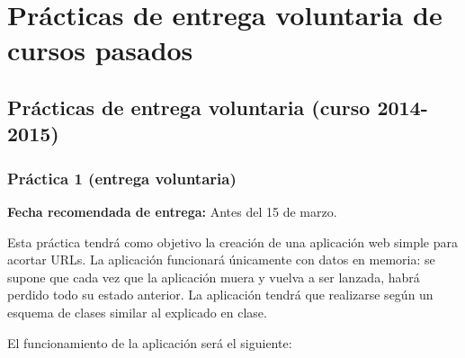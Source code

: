 \section{Prácticas de entrega voluntaria de cursos pasados}

\subsection{Prácticas de entrega voluntaria (curso 2014-2015)}


\subsubsection{Práctica 1 (entrega voluntaria)}
\label{subsec:practica-vol-1-2013}

\textbf{Fecha recomendada de entrega:} Antes del 15 de marzo.

Esta práctica tendrá como objetivo la creación de una aplicación web simple para acortar URLs. La aplicación funcionará únicamente con datos en memoria: se supone que cada vez que la aplicación muera y vuelva a ser lanzada, habrá perdido todo su estado anterior. La aplicación tendrá que realizarse según un esquema de clases similar al explicado en clase.

El funcionamiento de la aplicación será el siguiente:

